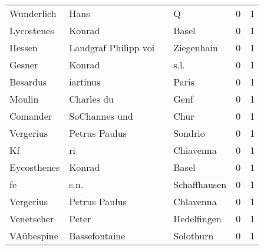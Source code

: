 \begin{center}
\begin{tiny}
\begin{longtabu}{llllrr}
               Wunderlich &                               Hans &             &                                           Q &          0 &         1 \\
               Lycostenes &                             Konrad &             &                                       Basel &          0 &         1 \\
                   Hessen &               Landgraf Philipp voi &             &                                  Ziegenhain &          0 &         1 \\
                   Gesner &                             Konrad &             &                                        s.l. &          0 &         1 \\
                 Besardus &                           iartinus &             &                                       Paris &          0 &         1 \\
                   Moulin &                         Charles du &             &                                        Genf &          0 &         1 \\
                 Comander &                      SoChannes und &             &                                        Chur &          0 &         1 \\
                Vergerius &                      Petrus Paulus &             &                                     Sondrio &          0 &         1 \\
                       Kf &                                 ri &             &                                   Chiavenna &          0 &         1 \\
              Eycosthenes &                             Konrad &             &                                       Basel &          0 &         1 \\
                       fe &                               s.n. &             &                                Schaffhausen &          0 &         1 \\
                Vergerius &                      Petrus Paulus &             &                                   Chlavenna &          0 &         1 \\
               Venetscher &                              Peter &             &                                 Hedelfingen &          0 &         1 \\
               VAübespine &                      Bassefontaine &             &                                   Solothurn &          0 &         1 \\

\end{longtabu}
\end{tiny}
\end{center}
